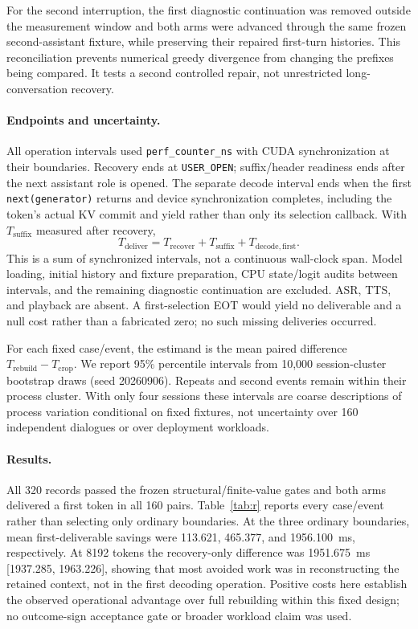 For the second interruption, the first diagnostic continuation was removed outside the measurement window and both arms were advanced through the same frozen second-assistant fixture, while preserving their repaired first-turn histories. This reconciliation prevents numerical greedy divergence from changing the prefixes being compared. It tests a second controlled repair, not unrestricted long-conversation recovery.

\paragraph{Endpoints and uncertainty.}
All operation intervals used \texttt{perf\_counter\_ns} with CUDA synchronization at their boundaries. Recovery ends at \texttt{USER\_OPEN}; suffix/header readiness ends after the next assistant role is opened. The separate decode interval ends when the first \texttt{next(generator)} returns and device synchronization completes, including the token's actual KV commit and yield rather than only its selection callback. With $T_{\mathrm{suffix}}$ measured after recovery,
\begin{equation}
T_{\mathrm{deliver}}=T_{\mathrm{recover}}+T_{\mathrm{suffix}}+T_{\mathrm{decode,first}}.
\label{eq:recovery-cost}
\end{equation}
This is a sum of synchronized intervals, not a continuous wall-clock span. Model loading, initial history and fixture preparation, CPU state/logit audits between intervals, and the remaining diagnostic continuation are excluded. ASR, TTS, and playback are absent. A first-selection EOT would yield no deliverable and a null cost rather than a fabricated zero; no such missing deliveries occurred.

For each fixed case/event, the estimand is the mean paired difference $T_{\mathrm{rebuild}}-T_{\mathrm{crop}}$. We report 95\% percentile intervals from 10,000 session-cluster bootstrap draws (seed 20260906). Repeats and second events remain within their process cluster. With only four sessions these intervals are coarse descriptions of process variation conditional on fixed fixtures, not uncertainty over 160 independent dialogues or over deployment workloads.

\paragraph{Results.}
All 320 records passed the frozen structural/finite-value gates and both arms delivered a first token in all 160 pairs. Table~\ref{tab:r} reports every case/event rather than selecting only ordinary boundaries. At the three ordinary boundaries, mean first-deliverable savings were 113.621, 465.377, and 1956.100~ms, respectively. At 8192 tokens the recovery-only difference was 1951.675~ms [1937.285, 1963.226], showing that most avoided work was in reconstructing the retained context, not in the first decoding operation. Positive costs here establish the observed operational advantage over full rebuilding within this fixed design; no outcome-sign acceptance gate or broader workload claim was used.

